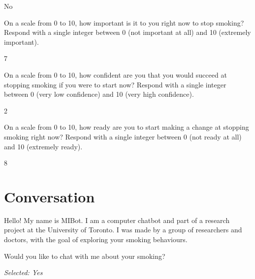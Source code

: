 \begin{clientbox}
	No
\end{clientbox}

\begin{researcherbox}
	On a scale from 0 to 10, how important is it to you right now to stop smoking? Respond with a single integer between 0 (not important at all) and 10 (extremely important).
\end{researcherbox}

\begin{clientbox}
	7
\end{clientbox}

\begin{researcherbox}
	On a scale from 0 to 10, how confident are you that you would succeed at stopping smoking if you were to start now? Respond with a single integer between 0 (very low confidence) and 10 (very high confidence).
\end{researcherbox}

\begin{clientbox}
	2
\end{clientbox}

\begin{researcherbox}
	On a scale from 0 to 10, how ready are you to start making a change at stopping smoking right now? Respond with a single integer between 0 (not ready at all) and 10 (extremely ready).
\end{researcherbox}

\begin{clientbox}
	8
\end{clientbox}

\section*{Conversation}

\begin{counsellorbox}
	Hello! My name is MIBot. I am a computer chatbot and part of a research project at the University of Toronto. I was made by a group of researchers and doctors, with the goal of exploring your smoking behaviours.
\end{counsellorbox}

\begin{counsellorbox}
	Would you like to chat with me about your smoking?
\end{counsellorbox}

\begin{clientbox}
	\textit{Selected: Yes}
\end{clientbox}

